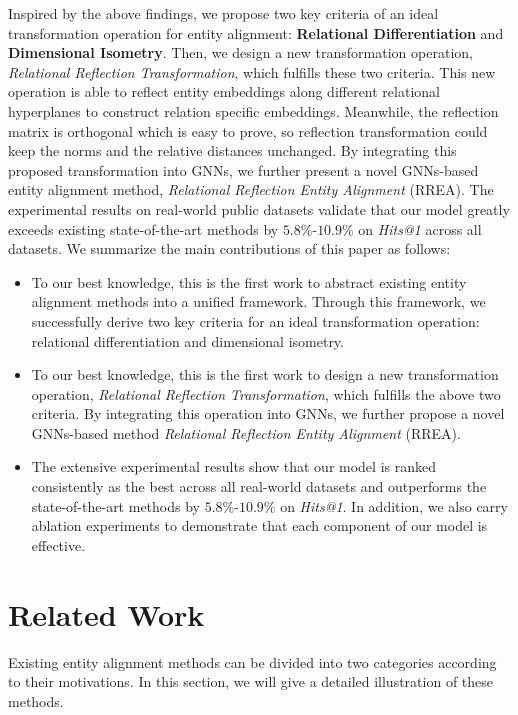 \documentclass[sigconf,camera-ready]{acmart}
\begin{document}
Inspired by the above findings, we propose two key criteria of an ideal transformation operation for entity alignment: \textbf{Relational Differentiation} and \textbf{Dimensional Isometry}.
Then, we design a new transformation operation, \emph{Relational Reflection Transformation}, which fulfills these two criteria.
This new operation is able to reflect entity embeddings along different relational hyperplanes to construct relation specific embeddings.
Meanwhile, the reflection matrix is orthogonal which is easy to prove, so reflection transformation could keep the norms and the relative distances unchanged.
By integrating this proposed transformation into GNNs, we further present a novel GNNs-based entity alignment method, \emph{Relational Reflection Entity Alignment} (RREA).
The experimental results on real-world public datasets validate that our model greatly exceeds existing state-of-the-art methods by $5.8\%$-$10.9\%$ on \emph{Hits@1} across all datasets.
We summarize the main contributions of this paper as follows:
\begin{itemize}
  \item To our best knowledge, this is the first work to abstract existing entity alignment methods into a unified framework.
      Through this framework, we successfully derive two key criteria for an ideal transformation operation: relational differentiation and dimensional isometry.
  \item To our best knowledge, this is the first work to design a new transformation operation, \emph{Relational Reflection Transformation}, which fulfills the above two criteria.
        By integrating this operation into GNNs, we further propose a novel GNNs-based method \emph{Relational Reflection Entity Alignment} (RREA).
  \item The extensive experimental results show that our model is ranked consistently as the best across all real-world datasets and outperforms the state-of-the-art methods by $5.8\%$-$10.9\%$ on \emph{Hits@1}.
      In addition, we also carry ablation experiments to demonstrate that each component of our model is effective.

\end{itemize}

\section{Related Work}
\label{sec:RW}
Existing entity alignment methods can be divided into two categories according to their motivations.
In this section, we will give a detailed illustration of these methods.
\end{document}
